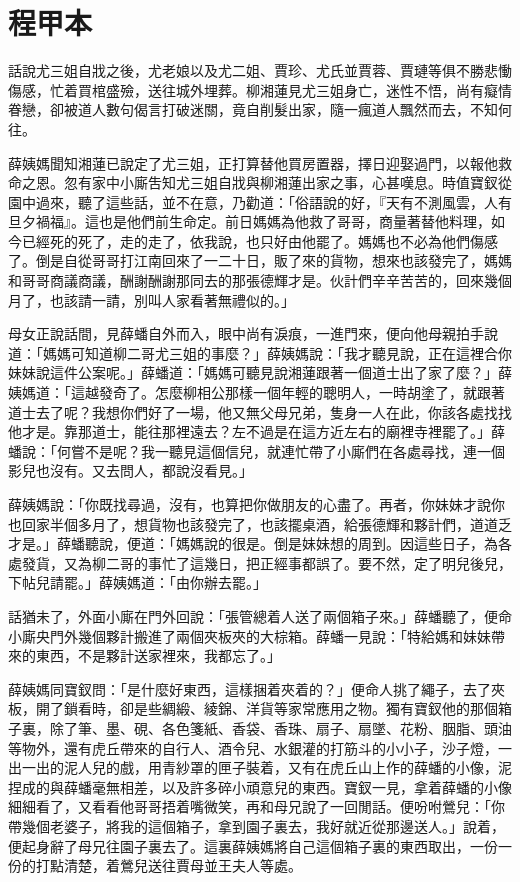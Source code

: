 \section*{程甲本}
話說尤三姐自戕之後，尤老娘以及尤二姐、賈珍、尤氏並賈蓉、賈璉等俱不勝悲慟傷感，忙着買棺盛殮，送往城外埋葬。柳湘蓮見尤三姐身亡，迷性不悟，尚有癡情眷戀，卻被道人數句偈言打破迷關，竟自削髮出家，隨一瘋道人飄然而去，不知何往。

薛姨媽聞知湘蓮已說定了尤三姐，正打算替他買房置器，擇日迎娶過門，以報他救命之恩。忽有家中小廝吿知尤三姐自戕與柳湘蓮出家之事，心甚嘆息。時值寶釵從園中過來，聽了這些話，並不在意，乃勸道：「俗語說的好，『天有不測風雲，人有旦夕禍福』。這也是他們前生命定。前日媽媽為他救了哥哥，商量著替他料理，如今已經死的死了，走的走了，依我說，也只好由他罷了。媽媽也不必為他們傷感了。倒是自從哥哥打江南回來了一二十日，販了來的貨物，想來也該發完了，媽媽和哥哥商議商議，酬謝酬謝那同去的那張德輝才是。伙計們辛辛苦苦的，回來幾個月了，也該請一請，別叫人家看著無禮似的。」

母女正說話間，見薛蟠自外而入，眼中尚有淚痕，一進門來，便向他母親拍手說道：「媽媽可知道柳二哥尤三姐的事麼？」薛姨媽說：「我才聽見說，正在這裡合你妹妹說這件公案呢。」薛蟠道：「媽媽可聽見說湘蓮跟著一個道士出了家了麼？」薛姨媽道：「這越發奇了。怎麼柳相公那樣一個年輕的聰明人，一時胡塗了，就跟著道士去了呢？我想你們好了一場，他又無父母兄弟，隻身一人在此，你該各處找找他才是。靠那道士，能往那裡遠去？左不過是在這方近左右的廟裡寺裡罷了。」薛蟠說：「何嘗不是呢？我一聽見這個信兒，就連忙帶了小廝們在各處尋找，連一個影兒也沒有。又去問人，都說沒看見。」

薛姨媽說：「你既找尋過，沒有，也算把你做朋友的心盡了。再者，你妹妹才說你也回家半個多月了，想貨物也該發完了，也該擺桌酒，給張德輝和夥計們，道道乏才是。」薛蟠聽說，便道：「媽媽說的很是。倒是妹妹想的周到。因這些日子，為各處發貨，又為柳二哥的事忙了這幾日，把正經事都誤了。要不然，定了明兒後兒，下帖兒請罷。」薛姨媽道：「由你辦去罷。」

話猶未了，外面小廝在門外回說：「張管總着人送了兩個箱子來。」薛蟠聽了，便命小廝央門外幾個夥計搬進了兩個夾板夾的大棕箱。薛蟠一見說：「特給媽和妹妹帶來的東西，不是夥計送家裡來，我都忘了。」

薛姨媽同寶釵問：「是什麼好東西，這樣捆着夾着的？」便命人挑了繩子，去了夾板，開了鎖看時，卻是些綢緞、綾錦、洋貨等家常應用之物。獨有寶釵他的那個箱子裏，除了筆、墨、硯、各色箋紙、香袋、香珠、扇子、扇墜、花粉、胭脂、頭油等物外，還有虎丘帶來的自行人、酒令兒、水銀灌的打筋斗的小小子，沙子燈，一出一出的泥人兒的戲，用青紗罩的匣子裝着，又有在虎丘山上作的薛蟠的小像，泥捏成的與薛蟠毫無相差，以及許多碎小頑意兒的東西。寶釵一見，拿着薛蟠的小像細細看了，又看看他哥哥捂着嘴微笑，再和母兄說了一回閒話。便吩咐鶯兒：「你帶幾個老婆子，將我的這個箱子，拿到園子裏去，我好就近從那邊送人。」說着，便起身辭了母兄往園子裏去了。這裏薛姨媽將自己這個箱子裏的東西取出，一份一份的打點清楚，着鶯兒送往賈母並王夫人等處。

